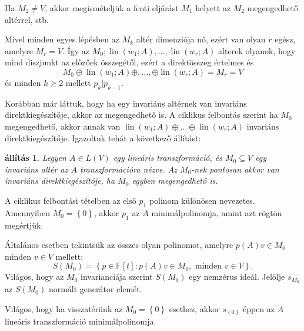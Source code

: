 \documentclass[a4paper, showtrims]{memoir}
\makeatletter
\renewenvironment{proof}[1][\proofname]
    {\par\pushQED{\qed}%
    \normalfont \topsep6\p@\@plus6\p@\relax
    \trivlist
    \item[\hskip\labelsep
        \itshape
    #1\@addpunct{:}]\ignorespaces}
    {\popQED\endtrivlist\@endpefalse}
\theoremstyle{plain}
\newtheorem{proposition}{állítás}[chapter]
\theoremstyle{remark}
\theoremstyle{definition}
\DeclareMathOperator{\lin}{lin}
\makeatother
\begin{document}
\begin{proof}
    Ha $M_2\neq V$, akkor megismételjük a fenti eljárást $M_1$ helyett az $M_2$ megengedhető altérrel, stb.

    Mivel minden egyes lépésben az $M_k$ altér dimenziója nő, ezért van olyan $r$ egész, amelyre $M_r=V$.
    Így az $M_0;\lin\left( w_1;A \right),\dots,\lin\left( w_r;A \right)$ alterek olyanok, 
    hogy mind diszjunkt az előzőek összegétől, ezért a direktösszeg értelmes és
    \[
        M_0\oplus\lin\left( w_1;A \right)\oplus,\ldots,\oplus\lin\left( w_r;A \right)=M_r=V
    \]
    és minden $k\geq 2$ mellett $p_{k}|p_{k-1}$.
\end{proof}

Korábban már láttuk, hogy ha egy invariáns altérnek van invariáns direktkiegészítője, akkor az megengedhető is.
A ciklikus felbontás szerint ha $M_0$ megengedhető, akkor annak van $\lin\left( w_1;A \right)\oplus\ldots\oplus\lin\left( w_r;A \right)$ invariáns direktkiegészítője.
Igazoltuk tehát a következő állítást:
\begin{proposition}
    Legyen $A\in L\left( V \right)$ egy lineáris transzformáció,
    és $M_0\subseteq V$ egy invariáns altér az $A$ transzformációra nézve.
    Az $M_0$-nek pontosan akkor van invariáns direktkiegészítóje, ha $M_0$ egyben megengedhető is.
\end{proposition}

A ciklikus felbontási tételben az első $p_1$ polinom különösen nevezetes. 
Amennyiben $M_0=\left\{ 0 \right\}$, akkor $p_1$ az $A$ minimálpolinomja,
amint azt rögtön megértjük.

Általános esetben tekintsük az összes olyan polinomot, amelyre $p\left( A \right)v\in M_0$ minden $v\in V$ mellett:
\[
S\left( M_0 \right)=\left\{ p\in\mathbb{F}\left[ t \right]:p\left( A \right)v\in M_0,\text{ minden } v\in V \right\}.
\]
Világos, hogy az $M_0$ invarianciája szerint $S\left( M_0 \right)$ egy nemzérus ideál.
Jelölje $s_{M_0}$ az $S\left( M_0 \right)$ normált generátor elemét.

Világos, hogy ha visszatérünk az $M_0=\left\{ 0 \right\}$ esethez,
akkor $s_{\left\{ 0 \right\}}$ éppen az $A$ lineáris transzformáció minimálpolinomja.
\end{document}
